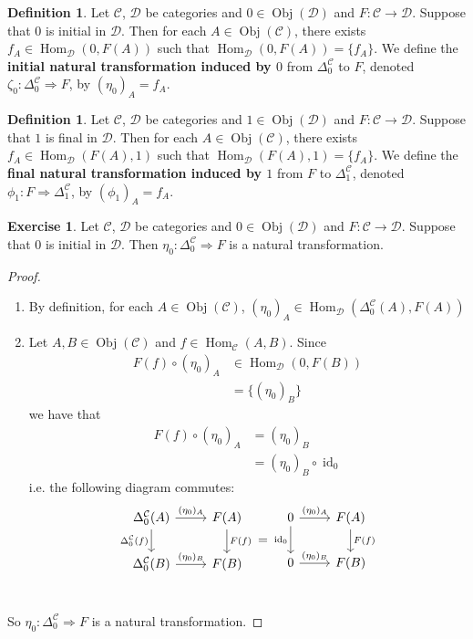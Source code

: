 \documentclass[12pt]{amsart}
\theoremstyle{definition}
\newtheorem{defn}[definition]{Definition}
\newtheorem{ex}[definition]{Exercise}
\newcommand{\Del}{\Delta}
\newcommand{\MC}{\mathcal{C}}
\newcommand{\MD}{\mathcal{D}}
\DeclareMathOperator{\id}{id}
\DeclareMathOperator{\Obj}{Obj}
\DeclareMathOperator{\Hom}{Hom}
\DeclareMathOperator*{\0}{\mbf{0}}
\DeclareMathOperator*{\1}{\mbf{1}}
\newcommand{\lex}[1]{\label{ex:#1}}
\newcommand{\ld}[1]{\label{defn:#1}}
\begin{document}
	\begin{defn} \ld{15017}
		Let $\MC$, $\MD$ be categories and $0 \in \Obj(\MD)$ and $F: \MC \rightarrow \MD$. Suppose that $0$ is initial in $\MD$. Then for each $A \in \Obj(\MC)$, there exists $f_A \in \Hom_{\MD}(0, F(A))$ such that $\Hom_{\MD}(0, F(A)) = \{f_A\}$. We define the \textbf{initial natural transformation induced by $0$} from $\Del^{\MC}_0$ to $F$, denoted $\zeta_{0}: \Del^{\MC}_0 \Rightarrow F$, by 
		$(\eta_0)_A = f_A$.
	\end{defn}

	\begin{defn} \ld{15017.1}
		Let $\MC$, $\MD$ be categories and $1 \in \Obj(\MD)$ and $F: \MC \rightarrow \MD$. Suppose that $1$ is final in $\MD$. Then for each $A \in \Obj(\MC)$, there exists $f_A \in \Hom_{\MD}(F(A), 1)$ such that $\Hom_{\MD}(F(A), 1) = \{f_A\}$. We define the \textbf{final natural transformation induced by $1$} from $F$ to $\Del^{\MC}_1$, denoted $\phi_{1}: F \Rightarrow \Del^{\MC}_1$, by 
		$(\phi_{1})_A = f_A$.
	\end{defn}

	\begin{ex} \lex{15018}
		Let $\MC$, $\MD$ be categories and $0 \in \Obj(\MD)$ and $F: \MC \rightarrow \MD$. Suppose that $0$ is initial in $\MD$. Then $\eta_0: \Del^{\MC}_0 \Rightarrow F$ is a natural transformation.
	\end{ex}

	\begin{proof} \
		\begin{enumerate}
			\item By definition, for each $A \in \Obj(\MC)$, $(\eta_0)_A \in \Hom_{\MD}(\Del^{\MC}_0(A), F(A))$
			\item Let $A, B \in \Obj(\MC)$ and $f \in \Hom_{\MC}(A, B)$. Since 
			\begin{align*}
				F(f) \circ (\eta_0)_A 
				& \in \Hom_{\MD}(0, F(B)) \\
				& = \{(\eta_0)_B\}
			\end{align*}
			we have that 
			\begin{align*}
				F(f) \circ (\eta_0)_A 
				& = (\eta_0)_B \\
				& = (\eta_0)_B \circ \id_0 
			\end{align*}
			i.e. the following diagram commutes:
			\[ 
			\begin{tikzcd}[baseline= 7]
				\Del^{\MC}_0(A)  \arrow[r, "(\eta_0)_A"]  \arrow[d, "\Del^{\MC}_0(f)"']  & F(A)   \arrow[d, "F(f)"]\\
				\Del^{\MC}_0(B) \arrow[r, "(\eta_0)_B"] &  F(B) \\
			\end{tikzcd}
			=
			\begin{tikzcd}[baseline= 7]
				0  \arrow[r, "(\eta_0)_A"]  \arrow[d, "\id_0"']  & F(A)   \arrow[d, "F(f)"]\\
				0 \arrow[r, "(\eta_0)_B"] &  F(B) \\
			\end{tikzcd}
			\]
		\end{enumerate}
		So $\eta_0: \Del^{\MC}_0 \Rightarrow F$ is a natural transformation.
	\end{proof}
	
\end{document}
